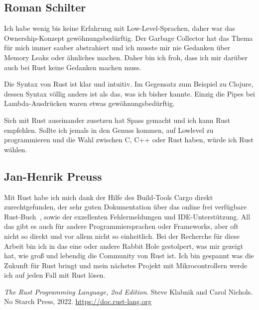 \documentclass[letterpaper,12pt]{article}
\begin{document}
    \subsection{Roman Schilter}\label{subsec:roman}
    Ich habe wenig bis keine Erfahrung mit Low-Level-Sprachen, daher war das Ownership-Konzept gewöhnungsbedürftig.
    Der Garbage Collector hat das Thema für mich immer sauber abstrahiert und ich musste mir nie Gedanken über Memory Leaks oder ähnliches machen.
    Daher bin ich froh, dass ich mir darüber auch bei Rust keine Gedanken machen muss.

    Die Syntax von Rust ist klar und intuitiv.
    Im Gegensatz zum Beispiel zu Clojure, dessen Syntax völlig anders ist als das, was ich bisher kannte.
    Einzig die Pipes bei Lambda-Ausdrücken waren etwas gewöhnungsbedürftig.

    Sich mit Rust auseinander zusetzen hat Spass gemacht und ich kann Rust empfehlen.
    Sollte ich jemals in den Genuss kommen, auf Lowlevel zu programmieren und die Wahl zwischen C, C++ oder Rust haben,
        würde ich Rust wählen.

    \subsection{Jan-Henrik Preuss}\label{subsec:jan}
    Mit Rust habe ich mich dank der Hilfe des Build-Tools Cargo direkt zurechtgefunden,
    der sehr guten Dokumentation über das online frei verfügbare Rust-Buch~\cite{rust-book}, sowie der exzellenten Fehlermeldungen und IDE-Unterstützung.
    All das gibt es auch für andere Programmiersprachen oder Frameworks, aber oft nicht so direkt und vor allem nicht so einheitlich.
    Bei der Recherche für diese Arbeit bin ich in das eine oder andere Rabbit Hole gestolpert, was mir gezeigt hat, wie groß und lebendig die Community von Rust ist.
    Ich bin gespannt was die Zukunft für Rust bringt und mein nächstes Projekt mit Mikrocontrollern werde ich auf jeden Fall mit Rust lösen.


    \begin{thebibliography}{9}

        \emph{The Rust Programming Language, 2nd Edition}.
        \newblock Steve Klabnik and Carol Nichols.
        \newblock No Starch Press, 2022.
        \newblock \url{https://doc.rust-lang.org}
    \end{thebibliography}
\end{document}
